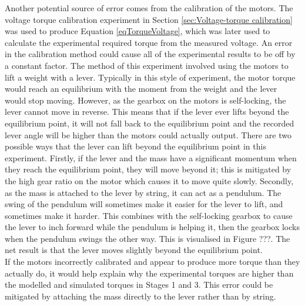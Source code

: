 Another potential source of error comes from the calibration of the motors. The voltage torque calibration experiment in Section \ref{sec:Voltage-torque calibration} was used to produce Equation \ref{eqTorqueVoltage}, which was later used to calculate the experimental required torque from the measured voltage. An error in the calibration method could cause all of the experimental results to be off by a constant factor. The method of this experiment involved using the motors to lift a weight with a lever. Typically in this style of experiment, the motor torque would reach an equilibrium with the moment from the weight and the lever would stop moving. However, as the gearbox on the motors is self-locking, the lever cannot move in reverse. This means that if the lever ever lifts beyond the equilibrium point, it will not fall back to the equilibrium point and the recorded lever angle will be higher than the motors could actually output. There are two possible ways that the lever can lift beyond the equilibrium point in this experiment. Firstly, if the lever and the mass have a significant momentum when they reach the equilibrium point, they will move beyond it; this is mitigated by the high gear ratio on the motor which causes it to move quite slowly. Secondly, as the mass is attached to the lever by string, it can act as a pendulum. The swing of the pendulum will sometimes make it easier for the lever to lift, and sometimes make it harder. This combines with the self-locking gearbox to cause the lever to inch forward while the pendulum is helping it, then the gearbox locks when the pendulum swings the other way. This is visualised in Figure ???. The net result is that the lever moves slightly beyond the equilibrium point. \\
If the motors incorrectly calibrated and appear to produce more torque than they actually do, it would help explain why the experimental torques are higher than the modelled and simulated torques in Stages 1 and 3. This error could be mitigated by attaching the mass directly to the lever rather than by string.

